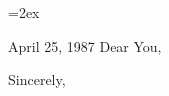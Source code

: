 \pagestyle{empty}
\parskip=2ex

\begin{titlepage}
\hfill April 25, 1987
\vfill
\noindent Dear You,


\vfill
\vfill
\hspace*{20em}Sincerely,

\vspace{3ex}
\vfill
\vfill
\vfill
\end{titlepage}

